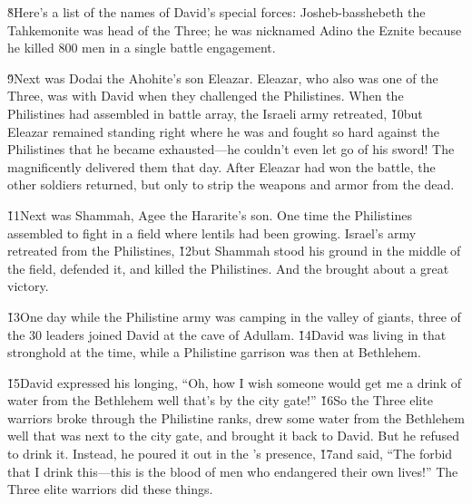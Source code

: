 \v{8}Here's a list of the names of David's special forces: Josheb-basshebeth the Tahkemonite was head of the Three; he was nicknamed Adino the Eznite because he killed 800 men in a single battle engagement.

\v{9}Next was Dodai the Ahohite's son Eleazar. Eleazar, who also was one of the Three, was with David when they challenged the Philistines. When the Philistines had assembled in battle array, the Israeli army retreated, \v{10}but Eleazar remained standing right where he was and fought so hard against the Philistines that he became exhausted---he couldn't even let go of his sword! The  magnificently delivered them that day. After Eleazar had won the battle, the other soldiers returned, but only to strip the weapons and armor from the dead.

\v{11}Next was Shammah, Agee the Hararite's son. One time the Philistines assembled to fight in a field where lentils had been growing. Israel's army retreated from the Philistines, \v{12}but Shammah stood his ground in the middle of the field, defended it, and killed the Philistines. And the  brought about a great victory.

\v{13}One day while the Philistine army was camping in the valley of giants, three of the 30 leaders joined David at the cave of Adullam. \v{14}David was living in that stronghold at the time, while a Philistine garrison was then at Bethlehem.

\v{15}David expressed his longing, ``Oh, how I wish someone would get me a drink of water from the Bethlehem well that's by the city gate!'' \v{16}So the Three elite warriors broke through the Philistine ranks, drew some water from the Bethlehem well that was next to the city gate, and brought it back to David. But he refused to drink it. Instead, he poured it out in the 's presence, \v{17}and said, ``The  forbid that I drink this---this is the blood of men who endangered their own lives!'' The Three elite warriors did these things.

